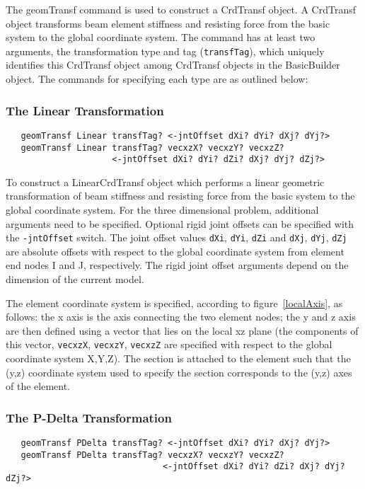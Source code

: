 \documentclass[12pt]{article}
\begin{document}
The geomTransf command is used to construct a CrdTransf object. A CrdTransf
object transforms beam element stiffness and resisting force from the 
basic system to the global coordinate system. The command has at least two 
arguments, the transformation type and tag ({\tt transfTag}), which uniquely
identifies this CrdTransf object among CrdTransf objects in the
BasicBuilder object. The commands for specifying each type are as
outlined below: 

\subsubsection{The Linear Transformation}
{\sf\small
\begin{verbatim}
   geomTransf Linear transfTag? <-jntOffset dXi? dYi? dXj? dYj?>
   geomTransf Linear transfTag? vecxzX? vecxzY? vecxzZ?
                     <-jntOffset dXi? dYi? dZi? dXj? dYj? dZj?>
\end{verbatim}
}

To construct a LinearCrdTransf object which performs a linear geometric
transformation of beam stiffness and resisting force from the basic system
to the global coordinate system. For the three dimensional problem,
additional arguments need to be specified. Optional rigid joint
offsets can be specified with the {\tt -jntOffset} switch. The joint offset
values {\tt dXi}, {\tt dYi}, {\tt dZi} and {\tt dXj}, {\tt dYj},
{\tt dZj} are absolute offsets with
respect to the global coordinate system from element end nodes I and
J, respectively. The rigid joint offset arguments depend on the
dimension of the current model.

The element coordinate system is specified, according to
figure~\ref{localAxis}, as follows: the x axis is the axis connecting
the two element nodes; the y and z axis are then defined using a
vector that lies on the local xz plane (the components of this vector,
{\tt vecxzX}, {\tt vecxzY}, {\tt vecxzZ} are specified with respect to
the global
coordinate system X,Y,Z). The section is attached to the element such
that the (y,z) coordinate system used to specify the section
corresponds to the (y,z) axes of the element. 



\subsubsection{The P-Delta Transformation}
{\sf\small
\begin{verbatim}
   geomTransf PDelta transfTag? <-jntOffset dXi? dYi? dXj? dYj?>
   geomTransf PDelta transfTag? vecxzX? vecxzY? vecxzZ? 
                               <-jntOffset dXi? dYi? dZi? dXj? dYj? dZj?>
\end{verbatim}
}
\end{document}
